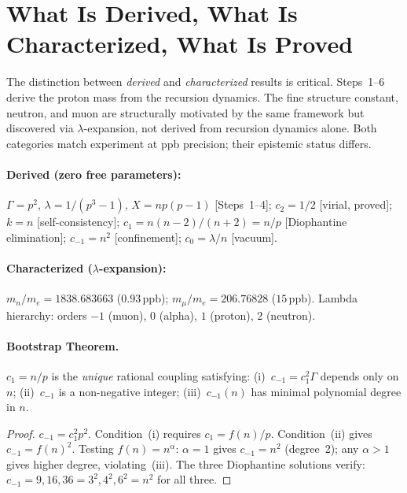 \documentclass[12pt,a4paper]{article}
\theoremstyle{definition}
\newcommand{\ppb}{\,\mathrm{ppb}}
\begin{document}
\section{What Is Derived, What Is Characterized, What Is Proved}

The distinction between \emph{derived} and \emph{characterized} results is
critical. Steps~1--6 derive the proton mass from the recursion dynamics.
The fine structure constant, neutron, and muon are structurally motivated
by the same framework but discovered via $\lambda$-expansion, not derived
from recursion dynamics alone. Both categories match experiment at ppb
precision; their epistemic status differs.

\paragraph{Derived (zero free parameters):}
$\Gamma = p^2$, $\lambda = 1/(p^3-1)$, $X = np(p-1)$ [Steps~1--4];
$c_2 = 1/2$ [virial, proved]; $k = n$ [self-consistency];
$c_1 = n(n-2)/(n+2) = n/p$ [Diophantine elimination];
$c_{-1} = n^2$ [confinement]; $c_0 = \lambda/n$ [vacuum].

\paragraph{Characterized ($\lambda$-expansion):}
$m_n/m_e = 1838.683663$ ($0.93\ppb$); $m_\mu/m_e = 206.76828$ ($15\ppb$).
Lambda hierarchy: orders $-1$ (muon), $0$ (alpha), $1$ (proton), $2$ (neutron).

\paragraph{Bootstrap Theorem.}
$c_1 = n/p$ is the \emph{unique} rational coupling satisfying:
(i)~$c_{-1} = c_1^2\Gamma$ depends only on $n$;
(ii)~$c_{-1}$ is a non-negative integer;
(iii)~$c_{-1}(n)$ has minimal polynomial degree in $n$.

\begin{proof}
$c_{-1} = c_1^2 p^2$. Condition~(i) requires $c_1 = f(n)/p$.
Condition~(ii) gives $c_{-1} = f(n)^2$. Testing $f(n) = n^\alpha$:
$\alpha = 1$ gives $c_{-1} = n^2$ (degree~2); any $\alpha > 1$ gives
higher degree, violating~(iii). The three Diophantine solutions verify:
$c_{-1} = 9, 16, 36 = 3^2, 4^2, 6^2 = n^2$ for all three.
\end{proof}
\end{document}
